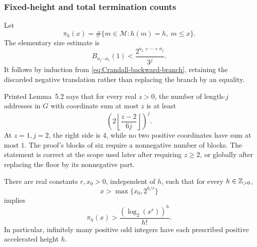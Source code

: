\subsubsection{Fixed-height and total termination counts}

Let
\[
 \pi_h(x)=\#\{m\in\mathcal M:h(m)=h,\ m\leq x\}.
\]
The elementary size estimate is
\begin{equation}
\label{eq:Crandall-backward-size}
 B_{a_j\cdots a_1}(1)
 <\frac{2^{a_1+\cdots+a_j}}{3^j}.
\end{equation}
It follows by induction from \eqref{eq:Crandall-backward-branch}, retaining
the discarded negative translation rather than replacing the branch by an
equality.

\begin{sourceissue}
\label{sourceissue:Crandall-lemma52-domain}
Printed Lemma~5.2 says that for every real $z>0$, the number of length-$j$
addresses in $G$ with coordinate sum at most $z$ is at least
\begin{equation}
\label{eq:Crandall-address-count}
 \left(2\left\lfloor\frac{z-2}{6j}\right\rfloor\right)^j.
\end{equation}
At $z=1,j=2$, the right side is $4$, while no two positive coordinates have
sum at most $1$.  The proof's blocks of six require a nonnegative number of
blocks.  The statement is correct at the scope used later after requiring
$z\geq2$, or globally after replacing the floor by its nonnegative part.
\end{sourceissue}

\begin{theorem}
\label{thm:Crandall-fixed-height-count}
There are real constants $r,x_0>0$, independent of $h$, such that for every
$h\in\mathbb{Z}_{>0}$,
\begin{equation}
\label{eq:Crandall-fixed-height-hypothesis}
 x>\max\{x_0,2^{h/r}\}
\end{equation}
implies
\begin{equation}
\label{eq:Crandall-fixed-height-bound}
 \pi_h(x)>\frac{(\log_2(x^r))^h}{h!}.
\end{equation}
In particular, infinitely many positive odd integers have each prescribed
positive accelerated height $h$.
\end{theorem}

